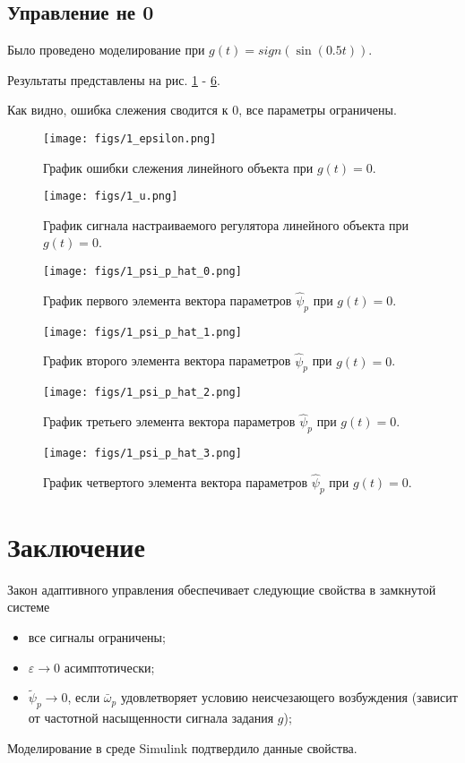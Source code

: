\documentclass{article}
\begin{document}
\subsection{Управление не 0}
Было проведено моделирование при \(g(t) = sign(\sin(0.5t))\). 

Результаты представлены на рис. \ref{fig:2_epsilon} - \ref{fig:2_psi0_psi_p_hat_3}.

Как видно, ошибка слежения сводится к 0, все параметры ограничены.
\begin{figure}[h!]
  \centering
  \texttt{[image: figs/1\_epsilon.png]}
  \caption{График ошибки слежения линейного объекта при \(g(t) = 0\).} 
  \label{fig:2_epsilon}
\end{figure}
\begin{figure}[h!]
  \centering
  \texttt{[image: figs/1\_u.png]}
  \caption{График сигнала настраиваемого регулятора линейного объекта при \(g(t) = 0\).} 
  \label{fig:2_u}
\end{figure}
\begin{figure}[h!]
  \centering
  \texttt{[image: figs/1\_psi\_p\_hat\_0.png]}
  \caption{График первого элемента вектора параметров \(\hat{\psi}_p\) при \(g(t) = 0\).} 
  \label{fig:2_psi0_psi_p_hat_0}
\end{figure}
\begin{figure}[h!]
  \centering
  \texttt{[image: figs/1\_psi\_p\_hat\_1.png]}
  \caption{График второго элемента вектора параметров \(\hat{\psi}_p\) при \(g(t) = 0\).} 
  \label{fig:2_psi0_psi_p_hat_1}
\end{figure}
\begin{figure}[h!]
  \centering
  \texttt{[image: figs/1\_psi\_p\_hat\_2.png]}
  \caption{График третьего элемента вектора параметров \(\hat{\psi}_p\) при \(g(t) = 0\).} 
  \label{fig:2_psi0_psi_p_hat_2}
\end{figure}
\begin{figure}[h!]
  \centering
  \texttt{[image: figs/1\_psi\_p\_hat\_3.png]}
  \caption{График четвертого элемента вектора параметров \(\hat{\psi}_p\) при \(g(t) = 0\).} 
  \label{fig:2_psi0_psi_p_hat_3}
\end{figure}
\FloatBarrier
\newpage
\FloatBarrier
\newpage
\section{Заключение}
Закон адаптивного управления обеспечивает следующие свойства в
замкнутой системе
\begin{itemize}
  \item все сигналы ограничены;
  \item \( \varepsilon \rightarrow 0 \) асимптотически;
  \item \( \tilde \psi_p \rightarrow 0 \), если \(\bar \omega_p\) удовлетворяет условию неисчезающего возбуждения (зависит от частотной насыщенности сигнала задания \(g\));
\end{itemize}
Моделирование в среде Simulink подтвердило данные свойства.
\end{document}
